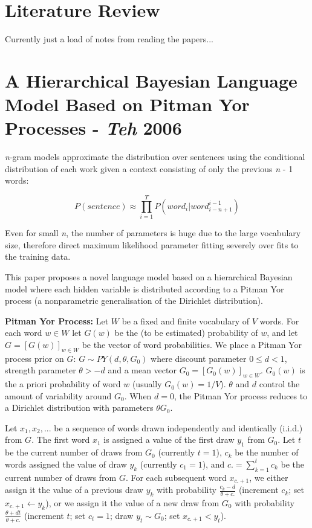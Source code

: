 
\section{Literature Review}

Currently just a load of notes from reading the papers...

\section{A Hierarchical Bayesian Language Model Based on Pitman Yor Processes - \textit{Teh} 2006}

\textit{n}-gram models approximate the distribution over sentences using the conditional distribution of each work given a context consisting of only the previous \textit{n} - 1 words:

\begin{equation}
P(sentence)\approx\prod_{i=1}^{T}P(word_{i}|word_{i-n+1}^{i-1})
\label{eq:nGramModel}
\end{equation}

Even for small \textit{n}, the number of parameters is huge due to the large vocabulary size, therefore direct maximum likelihood parameter fitting severely over fits to the training data.

This paper proposes a novel language model based on a hierarchical Bayesian model where each hidden variable is distributed according to a Pitman Yor process (a nonparametric generalisation of the Dirichlet distribution).

\textbf{Pitman Yor Process:} Let $W$ be a fixed and finite vocabulary of $V$ words. For each word $w \in W$ let $G(w)$ be the (to be estimated) probability of $w$, and let $G = [G(w)]_{w\in W}$ be the vector of word probabilities. We place a Pitman Yor process prior on $G$: $G \sim PY(d, \theta, G_{0})$ where discount parameter $0\leq d <1$, strength parameter $\theta >-d$ and a mean vector $G_{0} = [G_{0}(w)]_{w\in W}$. $G_{0}(w)$ is the a priori probability of word $w$ (usually $G_{0}(w) = 1/V$). $\theta$ and $d$ control the amount of variability around $G_{0}$. When $d=0$, the Pitman Yor process reduces to a Dirichlet distribution with parameters $\theta G_{0}$.

Let $x_{1}, x_{2}, ...$ be a sequence of words drawn independently and identically (i.i.d.) from $G$. The first word $x_{1}$ is assigned a value of the first draw $y_{1}$ from $G_{0}$. Let $t$ be the current number of draws from $G_{0}$ (currently $t=1$), $c_{k}$ be the number of words assigned the value of draw $y_{k}$ (currently $c_{1}=1$), and $c.=\sum_{k=1}^{t}c_{k}$ be the current number of draws from $G$. For each subsequent word $x_{c.+1}$, we either assign it the value of a previous draw $y_{k}$ with probability $\frac{c_{k}-d}{\theta +c.}$ (increment $c_{k}$; set $x_{c.+1}\leftarrow y_{k}$), or we assign it the value of a new draw from $G_{0}$ with probability $\frac{\theta +dt}{\theta +c.}$ (increment $t$; set $c_{t}=1$; draw $y_{t}\sim G_{0}$; set $x_{c.+1}<y_{t}$).

